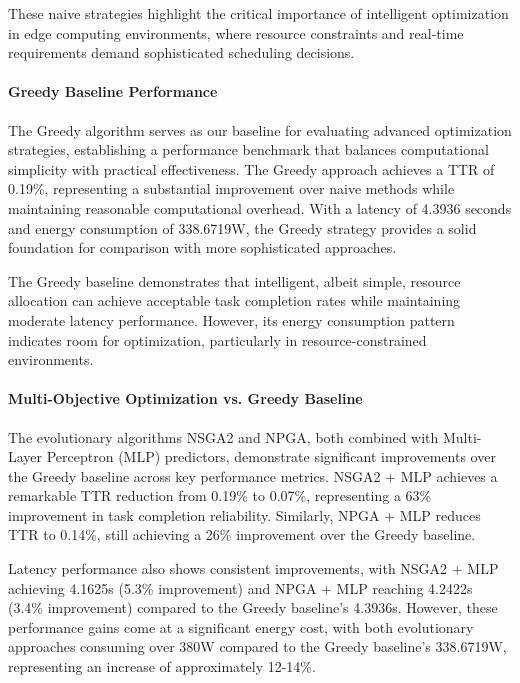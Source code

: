 \documentclass[preprint,12pt]{elsarticle}
\begin{document}
These naive strategies highlight the critical importance of intelligent optimization in edge computing environments, where resource constraints and real-time requirements demand sophisticated scheduling decisions.

\paragraph{Greedy Baseline Performance}

The Greedy algorithm serves as our baseline for evaluating advanced optimization strategies, establishing a performance benchmark that balances computational simplicity with practical effectiveness. The Greedy approach achieves a TTR of 0.19\%, representing a substantial improvement over naive methods while maintaining reasonable computational overhead. With a latency of 4.3936 seconds and energy consumption of 338.6719W, the Greedy strategy provides a solid foundation for comparison with more sophisticated approaches.

The Greedy baseline demonstrates that intelligent, albeit simple, resource allocation can achieve acceptable task completion rates while maintaining moderate latency performance. However, its energy consumption pattern indicates room for optimization, particularly in resource-constrained environments.

\paragraph{Multi-Objective Optimization vs. Greedy Baseline}

The evolutionary algorithms NSGA2 and NPGA, both combined with Multi-Layer Perceptron (MLP) predictors, demonstrate significant improvements over the Greedy baseline across key performance metrics. NSGA2 + MLP achieves a remarkable TTR reduction from 0.19\% to 0.07\%, representing a 63\% improvement in task completion reliability. Similarly, NPGA + MLP reduces TTR to 0.14\%, still achieving a 26\% improvement over the Greedy baseline.

Latency performance also shows consistent improvements, with NSGA2 + MLP achieving 4.1625s (5.3\% improvement) and NPGA + MLP reaching 4.2422s (3.4\% improvement) compared to the Greedy baseline's 4.3936s. However, these performance gains come at a significant energy cost, with both evolutionary approaches consuming over 380W compared to the Greedy baseline's 338.6719W, representing an increase of approximately 12-14\%.
\end{document}
